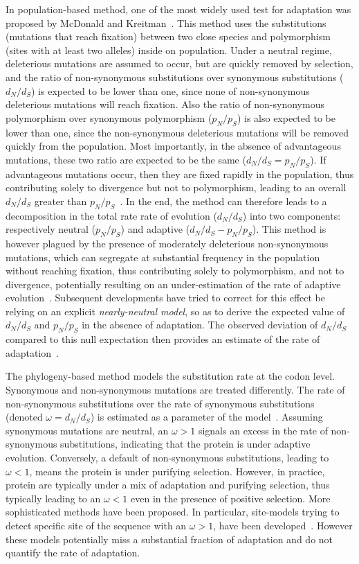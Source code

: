 \documentclass{article}
\begin{document}
In population-based method, one of the most widely used test for adaptation was proposed by McDonald and Kreitman~\citep{McDonald1991}.
This method uses the substitutions (mutations that reach fixation) between two close species and polymorphism (sites with at least two alleles) inside on population.
Under a neutral regime, deleterious mutations are assumed to occur, but are quickly removed by selection, and the ratio of non-synonymous substitutions over synonymous substitutions ($d_N/d_S$) is expected to be lower than one, since none of non-synonymous deleterious mutations will reach fixation.
Also the ratio of non-synonymous polymorphism over synonymous polymorphism ($p_N/p_S$) is also expected to be lower than one, since the non-synonymous deleterious mutations will be removed quickly from the population.
Most importantly, in the absence of advantageous mutations, these two ratio are expected to be the same ($d_N/d_S=p_N/p_S$).
If advantageous mutations occur, then they are fixed rapidly in the population, thus contributing solely to divergence but not to polymorphism, leading to an overall $d_N/d_S$ greater than $p_N/p_S$~\citep{smith_adaptive_2002}.
In the end, the method can therefore leads to a decomposition in the total rate rate of evolution ($d_N/d_S$) into two components: respectively neutral ($p_N/p_S$) and adaptive ($d_N/d_S-p_N/p_S$).
This method is however plagued by the presence of moderately deleterious non-synonymous mutations, which can segregate at substantial frequency in the population without reaching fixation, thus contributing solely to polymorphism, and not to divergence, potentially resulting on an under-estimation of the rate of adaptive evolution~\citep{eyre-walker_quantifying_2002}.
Subsequent developments have tried to correct for this effect be relying on an explicit \textit{nearly-neutral model}, so as to derive the expected value of $d_N/d_S$ and $p_N/p_S$ in the absence of adaptation.
The observed deviation of $d_N/d_S$ compared to this null expectation then provides an estimate of the rate of adaptation~\citep{eyre-walker_estimating_2009, Galtier2016}.

The phylogeny-based method models the substitution rate at the codon level.
Synonymous and non-synonymous mutations are treated differently.
The rate of non-synonymous substitutions over the rate of synonymous substitutions (denoted $\omega=d_N/d_S$) is estimated as a parameter of the model~\citep{Muse1994,Goldman1994}.
Assuming synonymous mutations are neutral, an $\omega>1$ signals an excess in the rate of non-synonymous substitutions, indicating that the protein is under adaptive evolution.
Conversely, a default of non-synonymous substitutions, leading to $\omega<1$, means the protein is under purifying selection.
However, in practice, protein are typically under a mix of adaptation and purifying selection, thus typically leading to an $\omega<1$ even in the presence of positive selection.
More sophisticated methods have been proposed.
In particular, site-models trying to detect specific site of the sequence with an $\omega>1$, have been developed~\citep{Yang2000, Kosiol2008}.
However these models potentially miss a substantial fraction of adaptation and do not quantify the rate of adaptation.
\end{document}
